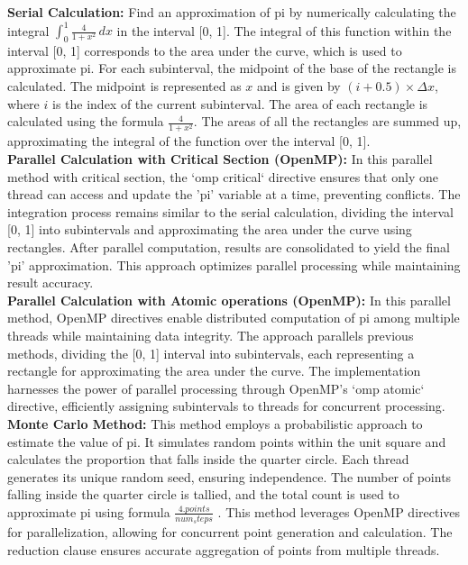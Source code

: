 \documentclass[11pt, twocolumn]{article}
\begin{document}
 \textbf{Serial Calculation:} Find an approximation of pi by numerically calculating the integral $\int_{0}^{1} \frac{4}{1 + x^2} \, dx$ in the interval [0, 1]. The integral of this function within the interval [0, 1] corresponds to the area under the curve, which is used to approximate pi. For each subinterval, the midpoint of the base of the rectangle is calculated. The midpoint is represented as $x$ and is given by $(i+0.5) \times \Delta x$, where $i$ is the index of the current subinterval. The area of each rectangle is calculated using the formula $\frac{4}{1 + x^2}$. The areas of all the rectangles are summed up, approximating the integral of the function over the interval [0, 1].
 \\
 \textbf{Parallel Calculation with Critical Section (OpenMP):} In this parallel method with critical section, the `omp critical` directive ensures that only one thread can access and update the 'pi' variable at a time, preventing conflicts. The integration process remains similar to the serial calculation, dividing the interval [0, 1] into subintervals and approximating the area under the curve using rectangles. After parallel computation, results are consolidated to yield the final 'pi' approximation. This approach optimizes parallel processing while maintaining result accuracy.
 \\
\textbf{Parallel Calculation with Atomic operations (OpenMP):} In this parallel method, OpenMP directives enable distributed computation of pi among multiple threads while maintaining data integrity. The approach parallels previous methods, dividing the [0, 1] interval into subintervals, each representing a rectangle for approximating the area under the curve. The implementation harnesses the power of parallel processing through OpenMP's `omp atomic` directive, efficiently assigning subintervals to threads for concurrent processing.
\\
\textbf{Monte Carlo Method:} This method employs a probabilistic approach to estimate the value of pi. It simulates random points within the unit square and calculates the proportion that falls inside the quarter circle. Each thread generates its unique random seed, ensuring independence. The number of points falling inside the quarter circle is tallied, and the total count is used to approximate pi using formula $\frac{4.points}{num_steps}$ . This method leverages OpenMP directives for parallelization, allowing for concurrent point generation and calculation. The reduction clause ensures accurate aggregation of points from multiple threads.
\end{document}
